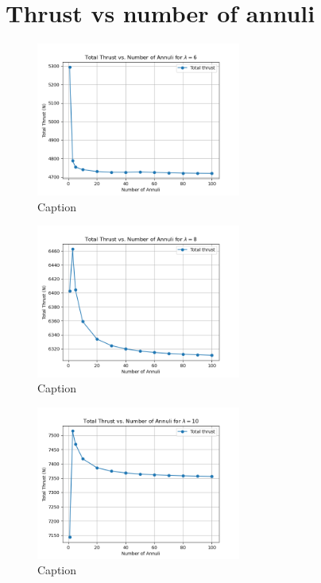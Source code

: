\section{Thrust vs number of annuli}
\begin{figure}[H]
    \centering
    \includegraphics[width=0.6\textwidth]{Figures/annuli_6.png}
    \caption{Caption}
    \label{fig:enter-label}
\end{figure}
\begin{figure}[H]
    \centering
    \includegraphics[width=0.6\textwidth]{Figures/annuli_8.png}
    \caption{Caption}
    \label{fig:enter-label}
\end{figure}
\begin{figure}[H]
    \centering
    \includegraphics[width=0.6\textwidth]{Figures/annuli_10.png}
    \caption{Caption}
    \label{fig:enter-label}
\end{figure}

